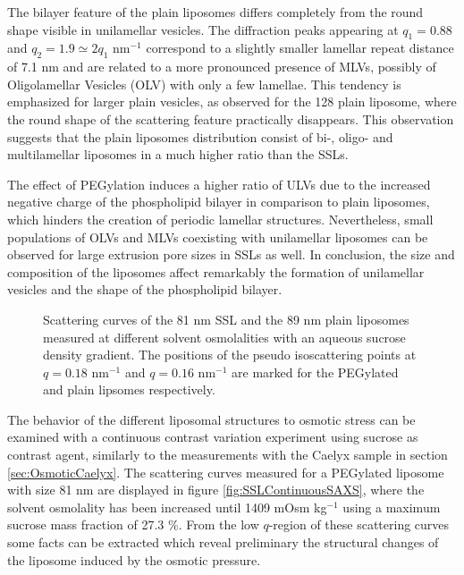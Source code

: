 The bilayer feature of the plain liposomes differs completely from the round shape visible in unilamellar vesicles. The diffraction peaks appearing at $q_1=0.88$ and $q_2=1.9\simeq2q_1$ nm$^{-1}$ correspond to a slightly smaller lamellar repeat distance of 7.1 nm and are related to a more pronounced presence of MLVs, possibly of Oligolamellar Vesicles (OLV) with only a few lamellae. This tendency is emphasized for larger plain vesicles, as observed for the 128 plain liposome, where the round shape of the scattering feature practically disappears. This observation suggests that the plain liposomes distribution consist of bi-, oligo- and multilamellar liposomes in a much higher ratio than the SSLs.

The effect of PEGylation induces a higher ratio of ULVs due to the increased negative charge of the phospholipid bilayer in comparison to plain liposomes, which hinders the creation of periodic lamellar structures. Nevertheless, small populations of OLVs and MLVs coexisting with unilamellar liposomes can be observed for large extrusion pore sizes in SSLs as well. In conclusion, the size and composition of the liposomes affect remarkably the formation of unilamellar vesicles and the shape of the phospholipid bilayer.

\begin{figure}
	\centering
		\subfloat[SSL 81 nm]{\resizebox{0.44\linewidth}{!}{}\label{fig:SSLContinuousSAXS}}
		\subfloat[Plain 89 nm]{\resizebox{0.44\linewidth}{!}{}\label{fig:PlainLiposomeContinuousSAXS}}
		\caption[Scattering curves of liposomes measured at different solvent osmolalities.]{Scattering curves of the 81 nm SSL and the 89 nm plain liposomes measured at different solvent osmolalities with an aqueous sucrose density gradient. The positions of the pseudo isoscattering points at $q=0.18$ nm$^{-1}$ and $q=0.16$ nm$^{-1}$ are marked for the PEGylated and plain lipsomes respectively.}
\end{figure}

The behavior of the different liposomal structures to osmotic stress can be examined with a continuous contrast variation experiment using sucrose as contrast agent, similarly to the measurements with the Caelyx sample in section \ref{sec:OsmoticCaelyx}. The scattering curves measured for a PEGylated liposome with size 81 nm are displayed in figure \ref{fig:SSLContinuousSAXS}, where the solvent osmolality has been increased until 1409 mOsm kg$^{-1}$ using a maximum sucrose mass fraction of 27.3 $\%$. From the low $q$-region of these scattering curves some facts can be extracted which reveal preliminary the structural changes of the liposome induced by the osmotic pressure.

